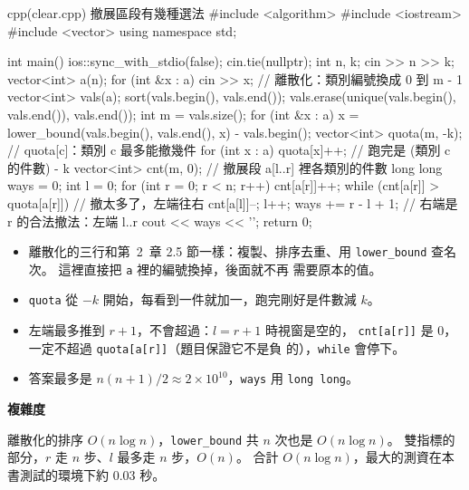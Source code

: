 \begin{example}[label=ex:ps-clear]{cpp}{(clear.cpp) 撤展區段有幾種選法}
#include <algorithm>
#include <iostream>
#include <vector>
using namespace std;

int main() {
    ios::sync_with_stdio(false);
    cin.tie(nullptr);
    int n, k;
    cin >> n >> k;
    vector<int> a(n);
    for (int &x : a) {
        cin >> x;
    }
    // 離散化：類別編號換成 0 到 m - 1
    vector<int> vals(a);
    sort(vals.begin(), vals.end());
    vals.erase(unique(vals.begin(), vals.end()), vals.end());
    int m = vals.size();
    for (int &x : a) {
        x = lower_bound(vals.begin(), vals.end(), x) - vals.begin();
    }
    vector<int> quota(m, -k);     // quota[c]：類別 c 最多能撤幾件
    for (int x : a) {
        quota[x]++;               // 跑完是 (類別 c 的件數) - k
    }
    vector<int> cnt(m, 0);        // 撤展段 a[l..r] 裡各類別的件數
    long long ways = 0;
    int l = 0;
    for (int r = 0; r < n; r++) {
        cnt[a[r]]++;
        while (cnt[a[r]] > quota[a[r]]) {   // 撤太多了，左端往右
            cnt[a[l]]--;
            l++;
        }
        ways += r - l + 1;        // 右端是 r 的合法撤法：左端 l..r
    }
    cout << ways << '\n';
    return 0;
}
\end{example}


\begin{itemize}
\item 離散化的三行和第~2~章 2.5 節一樣：複製、排序去重、用
\texttt{lower\_bound} 查名次。 這裡直接把 \texttt{a} 裡的編號換掉，後面就不再
需要原本的值。
\item \texttt{quota} 從 $-k$ 開始，每看到一件就加一，跑完剛好是件數減 $k$。
\item 左端最多推到 $r + 1$，不會超過：$l = r + 1$ 時視窗是空的，
\texttt{cnt[a[r]]} 是 $0$，一定不超過 \texttt{quota[a[r]]}（題目保證它不是負
的），\texttt{while} 會停下。
\item 答案最多是 $n(n + 1)/2 \approx 2 \times 10^{10}$，\texttt{ways} 用
\texttt{long long}。
\end{itemize}

\textbf{複雜度}

離散化的排序 $O(n \log n)$，\texttt{lower\_bound} 共 $n$ 次也是
$O(n \log n)$。 雙指標的部分，$r$ 走 $n$ 步、$l$ 最多走 $n$ 步，$O(n)$。 合計
$O(n \log n)$，最大的測資在本書測試的環境下約 $0.03$ 秒。

